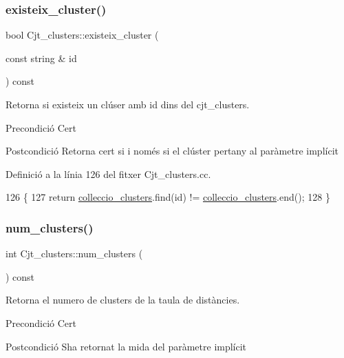 \subsubsection{\texorpdfstring{existeix\+\_\+cluster()}{existeix\_cluster()}}
{\footnotesize\ttfamily bool Cjt\+\_\+clusters\+::existeix\+\_\+cluster (\begin{DoxyParamCaption}\item[{const string \&}]{id }\end{DoxyParamCaption}) const}



Retorna si existeix un clúser amb id dins del cjt\+\_\+clusters. 

\begin{DoxyPrecond}{Precondició}
Cert 
\end{DoxyPrecond}
\begin{DoxyPostcond}{Postcondició}
Retorna cert si i només si el clúster pertany al paràmetre implícit 
\end{DoxyPostcond}


Definició a la línia 126 del fitxer Cjt\+\_\+clusters.\+cc.


\begin{DoxyCode}
126                                                          \{
127     \textcolor{keywordflow}{return} \hyperlink{class_cjt__clusters_aea7d6362517dd16cbd12736a3da50021}{colleccio\_clusters}.find(\textcolor{keywordtype}{id}) != \hyperlink{class_cjt__clusters_aea7d6362517dd16cbd12736a3da50021}{colleccio\_clusters}.end();
128 \}
\end{DoxyCode}
\mbox{\label{class_cjt__clusters_a6a240452c7964e1d6b7d54df7ee58563}} 
\subsubsection{\texorpdfstring{num\+\_\+clusters()}{num\_clusters()}}
{\footnotesize\ttfamily int Cjt\+\_\+clusters\+::num\+\_\+clusters (\begin{DoxyParamCaption}{ }\end{DoxyParamCaption}) const}



Retorna el numero de clusters de la taula de distàncies. 

\begin{DoxyPrecond}{Precondició}
Cert 
\end{DoxyPrecond}
\begin{DoxyPostcond}{Postcondició}
S\textquotesingle{}ha retornat la mida del paràmetre implícit 
\end{DoxyPostcond}



